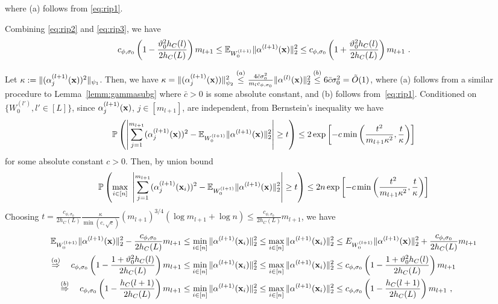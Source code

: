 where (a) follows from \eqref{eq:rip1}. 

Combining \eqref{eq:rip2} and \eqref{eq:rip3}, we have 
\begin{align}
c_{\phi,\sigma_0} \left(1 -  \frac{\vartheta_0^2 h_C(l)}{2h_C(L)}\right) m_{l+1}  \leq \mathbb{E}_{W_0^{(l+1)}}\| \alpha^{(l+1)}(\mathbf{x}) \|_2^2 \leq c_{\phi,\sigma_0} \left(1 +  \frac{\vartheta_0^2 h_C(l)}{2h_C(L)}\right) m_{l+1}~.
\label{eq:rip4}
\end{align}

Let $\kappa:= \| (\alpha_j^{(l+1)}(\mathbf{x}))^2 \|_{\psi_1}$. Then, we have
$\kappa  = \| (\alpha_j^{(l+1)}(\mathbf{x})) \|^2_{\psi_2} \overset{(a)}{\leq} \frac{4\bar{c} \sigma_0^2}{m_lc_{\phi,\sigma_0}} \| \alpha^{(l)}(\mathbf{x}) \|_2^2 \overset{(b)}{\leq} 6\bar{c}\sigma_0^2 = \tilde{O}(1)$,
where (a) follows from a similar procedure to Lemma~\ref{lemm:gammasubg} where $\bar{c}>0$ is some absolute constant, and (b) follows from~\eqref{eq:rip1}. Conditioned on $\{ W_0^{(l')}, l' \in [L] \}$, since $\alpha_j^{(l+1)}(\mathbf{x})$, $j \in [m_{l+1}]$, are independent, from Bernstein's inequality we have 
\begin{align*}
\mathbb{P}\left( \left| \sum_{j=1}^{m_{l+1}} (\alpha_j^{(l+1)}(\mathbf{x}))^2 - \mathbb{E}_{W_0^{(l+1)}}\| \alpha^{(l+1)}(\mathbf{x}) \|_2^2  \right| \geq t \right) \leq 2 \exp\left[-c \min\left(\frac{t^2}{m_{l+1} \kappa^2} , \frac{t}{\kappa} \right) \right]
\end{align*}
for some absolute constant $c>0$. Then, by union bound 
\begin{align*}
\mathbb{P}\left( \max_{i \in [n]} ~\left| \sum_{j=1}^{m_{l+1}} (\alpha_j^{(l+1)}(\mathbf{x}_i))^2 - \mathbb{E}_{W_0^{(l+1)}}\| \alpha^{(l+1)}(\mathbf{x}) \|_2^2  \right| \geq t \right) \leq 2n \exp\left[-c \min\left(\frac{t^2}{m_{l+1} \kappa^2} , \frac{t}{\kappa} \right) \right]
\end{align*}
Choosing $t = \frac{c_{\phi,\sigma_0}}{2h_C(L)} \frac{\kappa}{\min(c,\sqrt{c})} (m_{l+1})^{3/4} (\log m_{l+1} + \log n) \leq \frac{c_{\phi,\sigma_0}}{2h_C(L)} m_{l+1}$, we have 
\begin{align*}
\mathbb{E}_{W_0^{(l+1)}}\| \alpha^{(l+1)}(\mathbf{x}) \|_2^2 - \frac{c_{\phi,\sigma_0}}{2h_C(L)} m_{l+1}  & \leq \min_{i \in [n]} \| \alpha^{(l+1)}(\mathbf{x}_i) \|_2^2 \leq \max_{i \in [n]} \| \alpha^{(l+1)}(\mathbf{x}_i) \|_2^2 \leq  E_{W_0^{(l+1)}}\| \alpha^{(l+1)}(\mathbf{x}) \|_2^2 + \frac{c_{\phi,\sigma_0}}{2h_C(L)} m_{l+1} \\
\overset{(a)}{\Rightarrow} \quad  c_{\phi,\sigma_0} \left( 1 - \frac{1 + \vartheta_0^2 h_C(l)}{2h_C(L)} \right) m_{l+1} & \leq \min_{i \in [n]} \| \alpha^{(l+1)}(\mathbf{x}_i) \|_2^2 \leq \max_{i \in [n]} \| \alpha^{(l+1)}(\mathbf{x}_i) \|_2^2 \leq c_{\phi,\sigma_0} \left( 1 - \frac{1 + \vartheta_0^2 h_C(l)}{2h_C(L)} \right) m_{l+1} \\
\overset{(b)}{\Rightarrow} \quad c_{\phi,\sigma_0} \left( 1 - \frac{h_C(l+1)}{2h_C(L)} \right) m_{l+1} & \leq \min_{i \in [n]} \| \alpha^{(l+1)}(\mathbf{x}_i) \|_2^2 \leq \max_{i \in [n]} \| \alpha^{(l+1)}(\mathbf{x}_i) \|_2^2 \leq  c_{\phi,\sigma_0} \left( 1 - \frac{h_C(l+1)}{2h_C(L)} \right) m_{l+1}~,
\end{align*}
